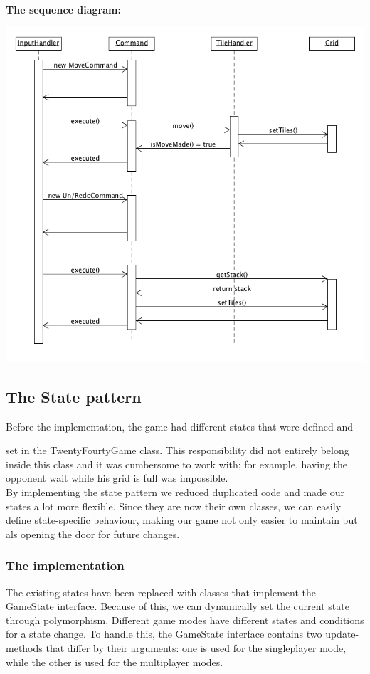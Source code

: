 \documentclass[a4paper,11pt,report]{scrartcl}
\begin{document}
\newpage\textbf{The sequence diagram:}\\
\centerline{\includegraphics[scale=0.5]{sources/commandPatternSequence}}

\newpage\subsection{The State pattern}
Before the implementation, the game had different states that were defined and 

set in the TwentyFourtyGame class. This responsibility did not entirely belong 
inside this class and it was cumbersome to work with; for example, having the
opponent wait while his grid is full was impossible.\\

By implementing the state pattern we reduced duplicated code and 
made our states a lot more flexible. Since they are now their own classes, we 
can easily define state-specific behaviour, making our game not only easier to
maintain but als opening the door for future changes.

\subsubsection{The implementation}

The existing states have been replaced with classes that implement the GameState interface.
Because of this, we can dynamically set the current state through polymorphism.
Different game modes have different states and conditions for a state change. To handle this,
the GameState interface contains two update-methods that differ by their arguments:
one is used for the singleplayer mode, while the other is used for the multiplayer modes.\\
\end{document}
